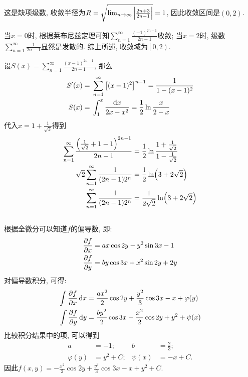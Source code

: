 \documentclass[12pt]{ctexart}
\begin{document}
\subsection{}
这是缺项级数, 收敛半径为$R=\sqrt{\lim_{n\rightarrow\infty}\abs{\frac{2n+3}{2n-1}}}=1$, 因此收敛区间是$(0,2)$.\par
当$x=0$时, 根据莱布尼兹定理可知$\sum_{n=1}^{\infty}\frac{(-1)^{2n-1}}{2n-1}$收敛; 当$x=2$时, 级数$\sum_{n=1}^{\infty}\frac{1}{2n-1}$显然是发散的. 综上所述, 收敛域为$\left[0,2\right)$.\par
设$S(x)=\sum_{n=1}^{\infty}\frac{(x-1)^{2n-1}}{2n-1}$, 那么
\begin{align*}
	S'(x)={}&\sum_{n=1}^{\infty}\qty[(x-1)^{2}]^{n-1}=\frac{1}{1-(x-1)^{2}}\\
	S(x)={}&\int_{1}^{x}\frac{\dd{x}}{2x-x^{2}}=\frac{1}{2}\ln{\frac{x}{2-x}}
\end{align*}
代入$x=1+\frac{1}{\sqrt{2}}$得到
\begin{align*}
	\sum_{n=1}^{\infty}\frac{\qty(\frac{1}{\sqrt{2}}+1-1)^{2n-1}}{2n-1}={}&\frac{1}{2}\ln{\frac{1+\frac{1}{\sqrt{2}}}{1-\frac{1}{\sqrt{2}}}}\\
	\sqrt{2}\sum_{n=1}^{\infty}\frac{1}{(2n-1)2^{n}}={}&\frac{1}{2}\ln(3+2\sqrt{2})\\
	\sum_{n=1}^{\infty}\frac{1}{(2n-1)2^{n}}={}&\frac{1}{2\sqrt{2}}\ln(3+2\sqrt{2})
\end{align*}
\subsection{}
根据全微分可以知道$f$的偏导数, 即:
\begin{align*}
	\pdv{f}{x}={}&ax\cos{2y}-y^{2}\sin{3x}-1\\
	\pdv{f}{y}={}&by\cos{3x}+x^{2}\sin{2y}+2y
\end{align*}
对偏导数积分, 可得:
\begin{align*}
	\int\pdv{f}{x}\dd{x}={}&\frac{ax^{2}}{2}\cos{2y}+\frac{y^{2}}{3}\cos{3x}-x+\varphi(y)\\
	\int\pdv{f}{y}\dd{y}={}&\frac{by^{2}}{2}\cos{3x}-\frac{x^{2}}{2}\cos{2y}+y^{2}+\psi(x)
\end{align*}
比较积分结果中的项, 可以得到
\begin{align*}
	a&=-1; & b&=\frac{2}{3};\\
	\varphi(y)&=y^{2}+C; & \psi(x)&=-x+C.
\end{align*}
因此$f(x,y)=-\frac{x^{2}}{2}\cos{2y}+\frac{y^{2}}{3}\cos{3x}-x+y^{2}+C$.\par
\end{document}

